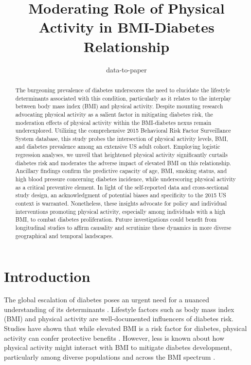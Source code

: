 \documentclass[11pt]{article}
\title{Moderating Role of Physical Activity in BMI-Diabetes Relationship}
\author{data-to-paper}
\begin{document}
\maketitle
\begin{abstract}
The burgeoning prevalence of diabetes underscores the need to elucidate the lifestyle determinants associated with this condition, particularly as it relates to the interplay between body mass index (BMI) and physical activity. Despite mounting research advocating physical activity as a salient factor in mitigating diabetes risk, the moderation effects of physical activity within the BMI-diabetes nexus remain underexplored. Utilizing the comprehensive 2015 Behavioral Risk Factor Surveillance System database, this study probes the intersection of physical activity levels, BMI, and diabetes prevalence among an extensive US adult cohort. Employing logistic regression analyses, we unveil that heightened physical activity significantly curtails diabetes risk and moderates the adverse impact of elevated BMI on this relationship. Ancillary findings confirm the predictive capacity of age, BMI, smoking status, and high blood pressure concerning diabetes incidence, while underscoring physical activity as a critical preventive element. In light of the self-reported data and cross-sectional study design, an acknowledgment of potential biases and specificity to the 2015 US context is warranted. Nonetheless, these insights advocate for policy and individual interventions promoting physical activity, especially among individuals with a high BMI, to combat diabetes proliferation. Future investigations could benefit from longitudinal studies to affirm causality and scrutinize these dynamics in more diverse geographical and temporal landscapes.
\end{abstract}
\section*{Introduction}

The global escalation of diabetes poses an urgent need for a nuanced understanding of its determinants \cite{Wu2014RiskFC, Akter2014PrevalenceOD, Mayega2013DiabetesAP}. Lifestyle factors such as body mass index (BMI) and physical activity are well-documented influencers of diabetes risk. Studies have shown that while elevated BMI is a risk factor for diabetes, physical activity can confer protective benefits \cite{Wahid2016QuantifyingTA, Bohn2015ImpactOP, Shi2013PhysicalAS}. However, less is known about how physical activity might interact with BMI to mitigate diabetes development, particularly among diverse populations and across the BMI spectrum \cite{Bohn2015ImpactOP, Shi2013PhysicalAS, Wu2014RiskFC}.
\end{document}
